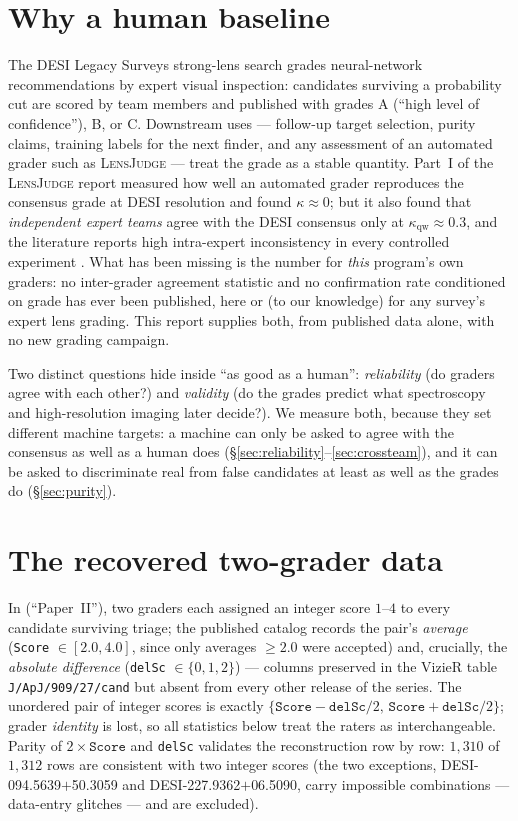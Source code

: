 \documentclass[11pt,letterpaper]{article}
\newcommand{\lj}{\textsc{LensJudge}}
\newcommand{\qwk}{\ensuremath{\kappa_{\mathrm{qw}}}}
\begin{document}
\section{Why a human baseline}\label{sec:why}
The DESI Legacy Surveys strong-lens search grades neural-network recommendations by expert
visual inspection: candidates surviving a probability cut are scored by team members and
published with grades A (``high level of confidence''), B, or C. Downstream uses --- follow-up
target selection, purity claims, training labels for the next finder, and any assessment of an
automated grader such as \lj{} --- treat the grade as a stable quantity. Part~I of the \lj{}
report measured how well an automated grader reproduces the consensus grade at DESI resolution
and found $\kappa\approx0$; but it also found that \emph{independent expert teams} agree with
the DESI consensus only at $\qwk\approx0.3$, and the literature reports high intra-expert
inconsistency in every controlled experiment \citep{rojas2023vi,canameras2021holismokes,
petrillo2019links,euclidq1engine}. What has been missing is the number for \emph{this} program's
own graders: no inter-grader agreement statistic and no confirmation rate conditioned on grade
has ever been published, here or (to our knowledge) for any survey's expert lens grading. This
report supplies both, from published data alone, with no new grading campaign.

Two distinct questions hide inside ``as good as a human'': \emph{reliability} (do graders agree
with each other?) and \emph{validity} (do the grades predict what spectroscopy and
high-resolution imaging later decide?). We measure both, because they set different machine
targets: a machine can only be asked to agree with the consensus as well as a human does
(\S\ref{sec:reliability}--\ref{sec:crossteam}), and it can be asked to discriminate real from
false candidates at least as well as the grades do (\S\ref{sec:purity}).

\section{The recovered two-grader data}\label{sec:data}
In \citet{huang2021desi} (``Paper~II''), two graders each assigned an integer score $1$--$4$
to every candidate surviving triage; the published catalog records the pair's \emph{average}
(\texttt{Score} $\in[2.0,4.0]$, since only averages $\geq2.0$ were accepted) and, crucially, the
\emph{absolute difference} (\texttt{delSc} $\in\{0,1,2\}$) --- columns preserved in the VizieR
table \texttt{J/ApJ/909/27/cand} but absent from every other release of the series. The
unordered pair of integer scores is exactly $\{\texttt{Score}-\texttt{delSc}/2,\,
\texttt{Score}+\texttt{delSc}/2\}$; grader \emph{identity} is lost, so all statistics below
treat the raters as interchangeable. Parity of $2\times\texttt{Score}$ and \texttt{delSc}
validates the reconstruction row by row: $1{,}310$ of $1{,}312$ rows are consistent with two
integer scores (the two exceptions, DESI-094.5639$+$50.3059 and DESI-227.9362$+$06.5090, carry
impossible combinations --- data-entry glitches --- and are excluded).
\end{document}

